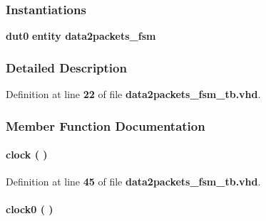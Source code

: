 \subsubsection*{Instantiations}
 \begin{DoxyCompactItemize}
\item 
{\bf dut0}  {\bfseries entity data2packets\+\_\+fsm}   
\end{DoxyCompactItemize}


\subsubsection{Detailed Description}


Definition at line {\bf 22} of file {\bf data2packets\+\_\+fsm\+\_\+tb.\+vhd}.



\subsubsection{Member Function Documentation}
\paragraph[{clock}]{\setlength{\rightskip}{0pt plus 5cm} {\bfseries \textcolor{vhdlchar}{ }} clock ( ) \hspace{0.3cm}{\ttfamily [Process]}}\label{classdata2packets__fsm__tb_1_1tb__behave_af761a67e9d7ce9e23381088b6f2ae893}


Definition at line {\bf 45} of file {\bf data2packets\+\_\+fsm\+\_\+tb.\+vhd}.

\paragraph[{clock0}]{\setlength{\rightskip}{0pt plus 5cm} {\bfseries \textcolor{vhdlchar}{ }} clock0 ( ) \hspace{0.3cm}{\ttfamily [Process]}}\label{classdata2packets__fsm__tb_1_1tb__behave_a0ffcf9b3fa89917ed2b73a96f170b7ae}


